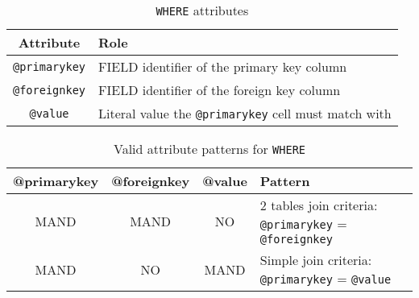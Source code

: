 \begin{table}[!htbp]
\small
\centering
\begin{tabulary}{\linewidth}{|c|J|}       
       \hline 
            \textbf{Attribute} & 
            \textbf {Role}\\
       \hline         \hline  
            \texttt{@primarykey} &
            FIELD identifier of the primary key column \\
        \hline 
            \texttt{@foreignkey} & 
            FIELD identifier of the foreign key column \\
        \hline 
            \texttt{@value} & 
            Literal value the  \texttt{@primarykey} cell must match with\\
        \hline 
     \end{tabulary}
     \caption{\texttt{WHERE} attributes} 
     \label{tbl:where-att}
 \end{table}

\begin{table}[!htbp]
\small
\centering
\begin{tabulary}{\linewidth}{|c|c|c|J|}
    \hline 
        \textbf{@primarykey} &
        \textbf{@foreignkey} &
        \textbf{@value} &
        \textbf{Pattern}\\
    \hline      \hline  
        MAND &           
        MAND &           
        NO &           
        2 tables join criteria: \texttt{@primarykey} = \texttt{@foreignkey} \\
    \hline     
        MAND &           
        NO &           
        MAND &           
        Simple join criteria: \texttt{@primarykey} = \texttt{@value} \\
   \hline 
\end{tabulary}
     \caption{Valid attribute patterns for  \texttt{WHERE}}
     \label{tbl:where-pattern}
\end{table}
